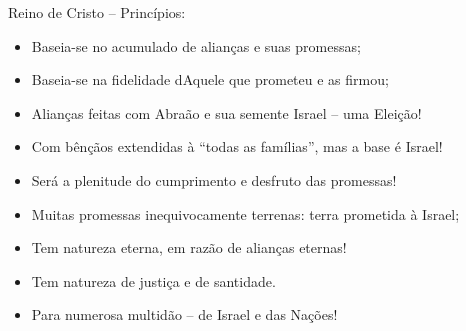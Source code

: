 \documentclass[12pt,aspectratio=169]{beamer}
\newcommand{\ORA}[1]{{\textcolor{TXred!50!TXyel}{#1}}}
\newcommand{\YEL}[1]{{\textcolor{TXyel}{#1}}}
\newcommand{\GRE}[1]{{\textcolor{TXgre}{#1}}}
\newcommand{\CYA}[1]{{\textcolor{TXcya}{#1}}}
\newcommand{\BLU}[1]{{\textcolor{TXblu}{#1}}}
\newcommand{\MAG}[1]{{\textcolor{TXmag}{#1}}}
\begin{document}
    \begin{frame}{\YEL{Reino de Cristo} -- Princípios:}
        \begin{itemize}
            \item<1-> Baseia-se no \YEL{acumulado} de \GRE{alianças} e suas \ORA{promessas};
            \item<1-> Baseia-se na \CYA{fidelidade} dAquele que prometeu e as firmou;
            \item<1-> Alianças feitas com Abraão e sua semente \BLU{Israel} -- uma \YEL{Eleição}!
            \item<2-> Com bênçãos extendidas à ``\YEL{todas as famílias}'', mas a base é
                \BLU{Israel}!
            \item<2-> Será a \YEL{plenitude do cumprimento} e desfruto das promessas!
            \item<2-> Muitas promessas inequivocamente \ORA{terrenas}: \ORA{terra} prometida à
                \BLU{Israel};
            \item<3-> Tem natureza \MAG{eterna}, em razão de alianças \MAG{eternas}!
            \item<3-> Tem natureza de \YEL{justiça} e de \YEL{santidade}.
            \item<3-> Para \GRE{numerosa multidão} -- de \BLU{Israel} e das Nações!
        \end{itemize}
    \end{frame}

\end{document}
